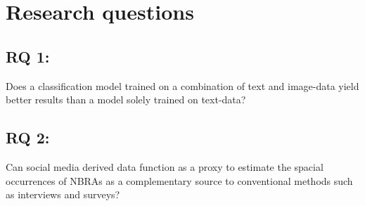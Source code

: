 \chapter{Research questions} \label{research_questions}

\section{RQ 1:}
Does a classification model trained on a combination of text and image-data yield better results than a model solely trained on text-data?

\section{RQ 2:}
Can social media derived data function as a proxy to estimate the spacial occurrences of NBRAs as a complementary source to conventional methods such as interviews and surveys?


